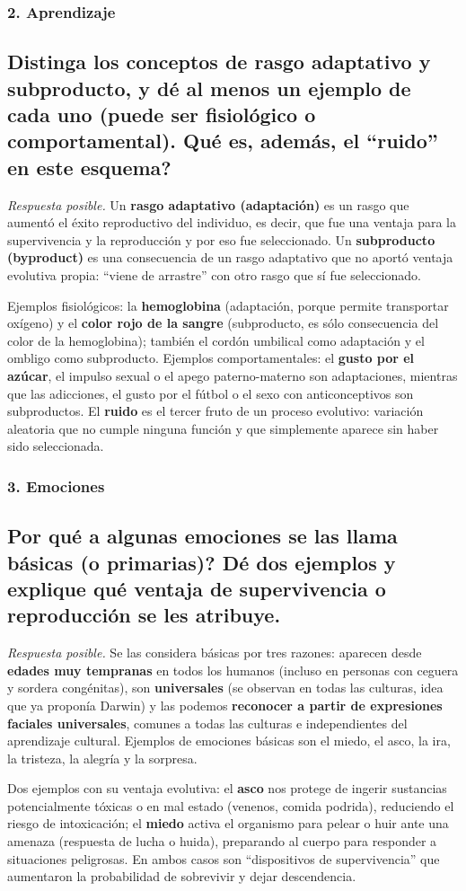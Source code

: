 \documentclass[11pt, a4paper]{article}
\newcommand{\pregunta}[1]{\subsection{#1}}
\newcommand{\eje}[1]{\subsubsection{#1}}
\begin{document}
\eje{2. Aprendizaje}
\pregunta{Distinga los conceptos de \textbf{rasgo adaptativo} y \textbf{subproducto}, y d\'e al menos un ejemplo de cada uno (puede ser fisiol\'ogico o comportamental). \textquestiondown Qu\'e es, adem\'as, el ``ruido'' en este esquema?}

\begin{respuesta}
\textit{Respuesta posible.} Un \textbf{rasgo adaptativo (adaptaci\'on)} es un rasgo que aument\'o el \'exito reproductivo del individuo, es decir, que fue una ventaja para la supervivencia y la reproducci\'on y por eso fue seleccionado. Un \textbf{subproducto (byproduct)} es una consecuencia de un rasgo adaptativo que no aport\'o ventaja evolutiva propia: ``viene de arrastre'' con otro rasgo que s\'i fue seleccionado.

Ejemplos fisiol\'ogicos: la \textbf{hemoglobina} (adaptaci\'on, porque permite transportar ox\'igeno) y el \textbf{color rojo de la sangre} (subproducto, es s\'olo consecuencia del color de la hemoglobina); tambi\'en el cord\'on umbilical como adaptaci\'on y el ombligo como subproducto. Ejemplos comportamentales: el \textbf{gusto por el az\'ucar}, el impulso sexual o el apego paterno-materno son adaptaciones, mientras que las adicciones, el gusto por el f\'utbol o el sexo con anticonceptivos son subproductos. El \textbf{ruido} es el tercer fruto de un proceso evolutivo: variaci\'on aleatoria que no cumple ninguna funci\'on y que simplemente aparece sin haber sido seleccionada.
\end{respuesta}

\eje{3. Emociones}
\pregunta{\textquestiondown Por qu\'e a algunas emociones se las llama \textbf{b\'asicas} (o primarias)? D\'e dos ejemplos y explique qu\'e ventaja de supervivencia o reproducci\'on se les atribuye.}

\begin{respuesta}
\textit{Respuesta posible.} Se las considera b\'asicas por tres razones: aparecen desde \textbf{edades muy tempranas} en todos los humanos (incluso en personas con ceguera y sordera cong\'enitas), son \textbf{universales} (se observan en todas las culturas, idea que ya propon\'ia Darwin) y las podemos \textbf{reconocer a partir de expresiones faciales universales}, comunes a todas las culturas e independientes del aprendizaje cultural. Ejemplos de emociones b\'asicas son el miedo, el asco, la ira, la tristeza, la alegr\'ia y la sorpresa.

Dos ejemplos con su ventaja evolutiva: el \textbf{asco} nos protege de ingerir sustancias potencialmente t\'oxicas o en mal estado (venenos, comida podrida), reduciendo el riesgo de intoxicaci\'on; el \textbf{miedo} activa el organismo para pelear o huir ante una amenaza (respuesta de lucha o huida), preparando al cuerpo para responder a situaciones peligrosas. En ambos casos son ``dispositivos de supervivencia'' que aumentaron la probabilidad de sobrevivir y dejar descendencia.
\end{respuesta}
\end{document}
